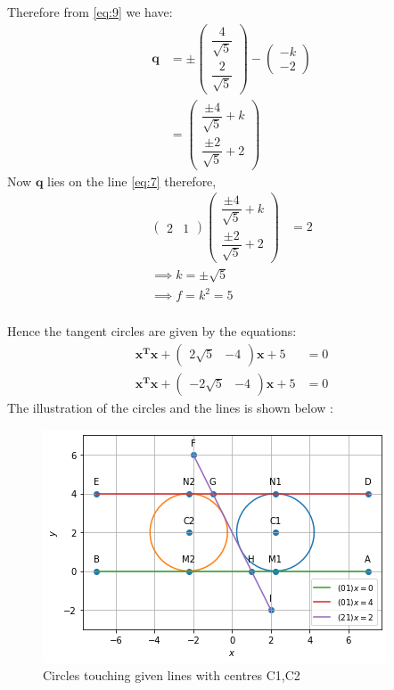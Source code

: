 \documentclass{beamer}
\newcommand{\myvec}[1]{\ensuremath{\begin{pmatrix}#1\end{pmatrix}}}
\renewcommand{\vec}[1]{\mathbf{#1}}
\begin{document}
\begin{frame}
\frametitle{}
Therefore from \eqref{eq:9} we have:
\begin{align}
\vec{q} &= \pm \myvec{\dfrac{4}{\sqrt{5}} \\ \dfrac{2}{\sqrt{5}} } - \myvec{-k \\ -2} \\
&=\myvec{\dfrac{\pm 4}{\sqrt{5}} +k \\\dfrac{\pm 2}{\sqrt{5}} +2}
\end{align}
Now $\vec{q}$ lies on the line \eqref{eq:7} therefore,
\begin{align}
\myvec{2 & 1}\myvec{\dfrac{\pm 4}{\sqrt{5}} +k \\\dfrac{\pm 2}{\sqrt{5}} +2} &= 2 \\
\implies k = \pm \sqrt{5}\\
\implies f = k^2 = 5
\end{align}
\end{frame}

\begin{frame}
\frametitle{}
Hence the tangent circles are given by the equations:
\begin{align}
\vec{x^T}\vec{x} + \myvec{2\sqrt{5} & -4}\vec{x} + 5 &= 0 \\
\vec{x^T}\vec{x} + \myvec{-2\sqrt{5} & -4}\vec{x} + 5 &= 0
\end{align}
The illustration of the circles and the lines is shown below :
\begin{figure}[!ht]
       \centering
    \includegraphics[width=0.6\columnwidth] {Assignment_3_Fig_1.png}
    \caption{Circles touching given lines with centres C1,C2}
    \label{Tangent circles to 3 given lines}
\end{figure}
\end{frame}
\end{document}

